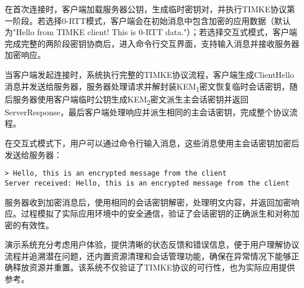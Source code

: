 在首次连接时，客户端加载服务器公钥，生成临时密钥对，并执行TIMKE协议第一阶段。若选择0-RTT模式，客户端会在初始消息中包含加密的应用数据（默认为"Hello from TIMKE client! This is 0-RTT data."）；若选择交互式模式，客户端完成完整的两阶段密钥协商后，进入命令行交互界面，支持输入消息并接收服务器加密响应。

当客户端发起连接时，系统执行完整的TIMKE协议流程，客户端生成ClientHello消息并发送给服务器，服务器处理请求并解封装KEM\textsubscript{1}密文恢复临时会话密钥，随后服务器使用客户端临时公钥生成KEM\textsubscript{2}密文派生主会话密钥并返回ServerResponse，最后客户端处理响应并派生相同的主会话密钥，完成整个协议流程。

在交互式模式下，用户可以通过命令行输入消息，这些消息使用主会话密钥加密后发送给服务器：

\begin{verbatim}
> Hello, this is an encrypted message from the client
Server received: Hello, this is an encrypted message from the client
\end{verbatim}

服务器收到加密消息后，使用相同的会话密钥解密，处理明文内容，并返回加密响应。过程模拟了实际应用环境中的安全通信，验证了会话密钥的正确派生和对称加密的有效性。

演示系统充分考虑用户体验，提供清晰的状态反馈和错误信息，便于用户理解协议流程并追溯潜在问题，还内置资源清理和会话管理功能，确保在异常情况下能够正确释放资源并重置。该系统不仅验证了TIMKE协议的可行性，也为实际应用提供参考。